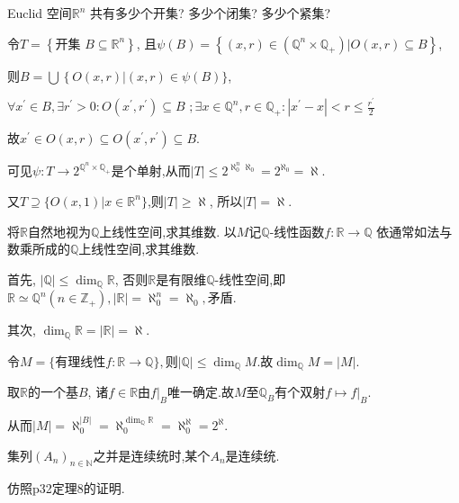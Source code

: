 \begin{8}
Euclid 空间$\mathbb{R}^n$ 共有多少个开集? 多少个闭集? 多少个紧集?
\end{8}   
\begin{solution}
令$T=\left\{\text{开集 }B\subseteq \mathbb{R}^{n}\right\}$, 且$\psi(B)=\left\{\left(x,r\right)\in\left(\mathbb{Q}^{n}\times \mathbb{Q}_{+}\right)|O(x,r)\subseteq B\right\}$,

则$B=\bigcup\left\{O(x,r)\right|\left(x,r\right)\in\psi(B)\}$,

$\forall x^{\prime}\in B,\exists r^{\prime}>0:O(x^{\prime},r^{\prime})\subseteq B$
$;\exists x\in\mathbb{Q}^{n},r\in\mathbb{Q}_+:|x^{\prime}-x|<r\leqslant\frac{r^{\prime}}{2}$

故$x^{\prime}\in O(x,r)\subseteq O(x^{\prime},r^{\prime})\subseteq B$.

可见$\psi:T\to 2^{\mathbb{Q}^n\times\mathbb{Q}_+}$是个单射,从而$|T|\leqslant 2^{\aleph_0^n\aleph_0}=2^{\aleph_0}=\aleph.$

又$T\supseteq\{O(x,1)|x\in\mathbb{R}^n\}$,则$|T|\geqslant\aleph$, 所以$|T|=\aleph$.
\end{solution}

\begin{10}
将$\mathbb{R}$自然地视为$\mathbb{Q}$上线性空间,求其维数.
以$M$记$\mathbb{Q}$-线性函数$f:\mathbb{R}\to\mathbb{Q}$
依通常如法与数乘所成的$\mathbb{Q}$上线性空间,求其维数.
   \end{10}
\begin{solution}
首先, $|\mathbb{Q}|\leqslant \dim_{\mathbb{Q}}\mathbb{R}$, 
否则$\mathbb{R}$是有限维$\mathbb{Q}$-线性空间,即$\mathbb{R}\simeq\mathbb{Q}^n(n\in\mathbb{Z}_+),|\mathbb{R}|=\aleph_0^n=\aleph_0,$矛盾.

其次, $\dim_{\mathbb{Q}}\mathbb{R}=|\mathbb{R}|=\aleph.$

令$M=\{$有理线性$f:\mathbb{R}\to\mathbb{Q}\},$则$|\mathbb{Q}|\leqslant\dim_{\mathbb{Q}}M.$故$\dim_{\mathbb{Q}}M=|M|.$

取$\mathbb{R}$的一个基$B$, 诸$f\in\mathbb{R}$由$f|_B$唯一确定.故$M$至$\mathbb{Q}_B$有个双射$f\mapsto f|_B.$

从而$|M|=\aleph_0^{|B|}=\aleph_0^{\dim_{\mathbb{Q}}\mathbb{R}}=\aleph_0^{\aleph}=2^{\aleph}.$

\end{solution}

\begin{13}
集列$(A_n)_{n\in\mathbb{N}}$之并是连续统时,某个$A_n$是连续统.
\end{13}
\begin{solution}
仿照p32定理8的证明.
\end{solution}


